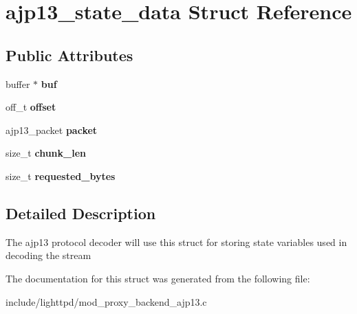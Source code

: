 \hypertarget{structajp13__state__data}{
\section{ajp13\_\-state\_\-data Struct Reference}
\label{structajp13__state__data}
}
\subsection*{Public Attributes}
\begin{CompactItemize}
\item 
\hypertarget{structajp13__state__data_05104320fc4dfebffd6e199c2a1cf223}{
buffer $\ast$ \textbf{buf}}
\label{structajp13__state__data_05104320fc4dfebffd6e199c2a1cf223}

\item 
\hypertarget{structajp13__state__data_15408e96744b63ad6cd03e83ff6e1369}{
off\_\-t \textbf{offset}}
\label{structajp13__state__data_15408e96744b63ad6cd03e83ff6e1369}

\item 
\hypertarget{structajp13__state__data_66198f3c961de2525eeb5c63171ffb13}{
ajp13\_\-packet \textbf{packet}}
\label{structajp13__state__data_66198f3c961de2525eeb5c63171ffb13}

\item 
\hypertarget{structajp13__state__data_1931c23e738ac24b5797ccaa5a5a875e}{
size\_\-t \textbf{chunk\_\-len}}
\label{structajp13__state__data_1931c23e738ac24b5797ccaa5a5a875e}

\item 
\hypertarget{structajp13__state__data_8487799ea44d1f053807646845a9d617}{
size\_\-t \textbf{requested\_\-bytes}}
\label{structajp13__state__data_8487799ea44d1f053807646845a9d617}

\end{CompactItemize}


\subsection{Detailed Description}
The ajp13 protocol decoder will use this struct for storing state variables used in decoding the stream 

The documentation for this struct was generated from the following file:\begin{CompactItemize}
\item 
include/lighttpd/mod\_\-proxy\_\-backend\_\-ajp13.c\end{CompactItemize}
